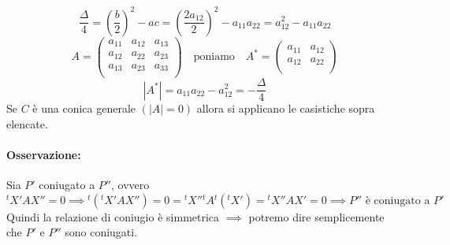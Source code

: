 \documentclass{report}
\begin{document}
\[
\frac{\Delta}{4} = \left( \frac{b}{2} \right) ^2 - ac = \left( \frac{2a_{12}}{2} \right) ^2 - a_{11} a_{22} = a_{12}^2 - a_{11} a_{22}
\] \[
A = 
\begin{pmatrix}
    a_{11} & a_{12} & a_{13} \\
    a_{12} & a_{22} & a_{23} \\
    a_{13} & a_{23} & a_{33} \\
\end{pmatrix}
\quad \text{poniamo} \quad A^* =
\begin{pmatrix}
    a_{11} & a_{12} \\
    a_{12} & a_{22} \\
\end{pmatrix} \]
\[
|A^{*}| = a_{11}a_{22}-a_{12}^2= - \frac{\Delta}{4}
\] Se \(C\) è una conica generale \((|A| = 0)\) allora si applicano le casistiche sopra elencate.


\paragraph{Osservazione:} Sia \(P'\) coniugato a \(P ''\), ovvero \[
    {^tX'} A X '' = 0 \implies {^t({^tX'}AX '')} = 0 = {^tX ''} {^tA}{^t({^tX'})} = {^tX ''} A X' = 0 \implies P '' \text{ è coniugato a } P' 
\] Quindi la relazione di coniugio è simmetrica \(\implies \) potremo dire semplicemente che \(P'\) e \(P ''\) sono coniugati.

\end{document}
